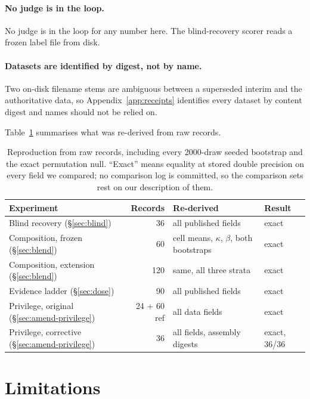 \documentclass{article}
\begin{document}
\paragraph{No judge is in the loop.} No judge is in the loop for any number here. The blind-recovery scorer
  reads a frozen label file from disk.

\paragraph{Datasets are identified by digest, not by name.} Two on-disk
  filename stems are ambiguous between a superseded interim and the
  authoritative data, so Appendix~\ref{app:receipts} identifies every dataset by
  content digest and names should not be relied on.

Table~\ref{tab:repro} summarises what was re-derived from raw records.

\begin{table}[htbp]
  \centering
  \small
  \begin{tabular}{lrll}
    \toprule
    Experiment & Records & Re-derived & Result \\
    \midrule
    Blind recovery (\S\ref{sec:blind}) & 36 & all published fields & exact \\
    Composition, frozen (\S\ref{sec:blend}) & 60 & cell means, $\kappa$, $\beta$, both bootstraps & exact \\
    Composition, extension (\S\ref{sec:blend}) & 120 & same, all three strata & exact \\
    Evidence ladder (\S\ref{sec:dose}) & 90 & all published fields & exact \\
    Privilege, original (\S\ref{sec:amend-privilege}) & 24 + 60 ref & all data fields & exact \\
    Privilege, corrective (\S\ref{sec:amend-privilege}) & 36 & all fields, assembly digests & exact, 36/36 \\
    \bottomrule
  \end{tabular}
  \caption{Reproduction from raw records, including every 2000-draw seeded
  bootstrap and the exact permutation null. ``Exact'' means equality at stored
  double precision on every field we compared; no comparison log is committed,
  so the comparison sets rest on our description of them.}
  \label{tab:repro}
\end{table}

\section{Limitations}
\label{sec:limits}
\end{document}
